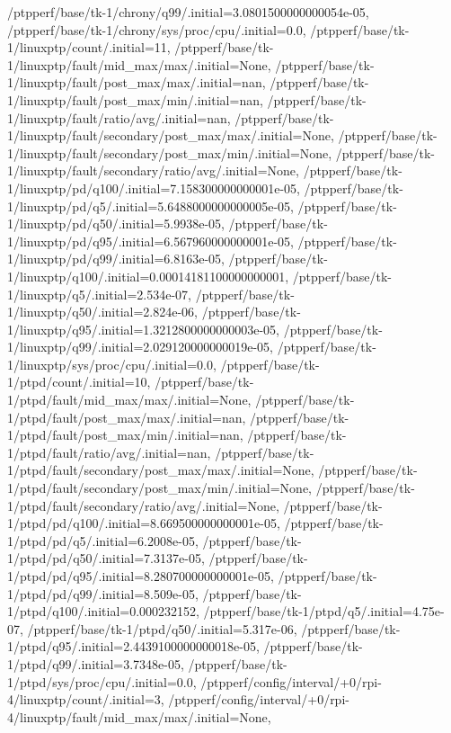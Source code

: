 {    /ptpperf/base/tk-1/chrony/q99/.initial=3.0801500000000054e-05,
    /ptpperf/base/tk-1/chrony/sys/proc/cpu/.initial=0.0,
    /ptpperf/base/tk-1/linuxptp/count/.initial=11,
    /ptpperf/base/tk-1/linuxptp/fault/mid_max/max/.initial=None,
    /ptpperf/base/tk-1/linuxptp/fault/post_max/max/.initial=nan,
    /ptpperf/base/tk-1/linuxptp/fault/post_max/min/.initial=nan,
    /ptpperf/base/tk-1/linuxptp/fault/ratio/avg/.initial=nan,
    /ptpperf/base/tk-1/linuxptp/fault/secondary/post_max/max/.initial=None,
    /ptpperf/base/tk-1/linuxptp/fault/secondary/post_max/min/.initial=None,
    /ptpperf/base/tk-1/linuxptp/fault/secondary/ratio/avg/.initial=None,
    /ptpperf/base/tk-1/linuxptp/pd/q100/.initial=7.158300000000001e-05,
    /ptpperf/base/tk-1/linuxptp/pd/q5/.initial=5.6488000000000005e-05,
    /ptpperf/base/tk-1/linuxptp/pd/q50/.initial=5.9938e-05,
    /ptpperf/base/tk-1/linuxptp/pd/q95/.initial=6.567960000000001e-05,
    /ptpperf/base/tk-1/linuxptp/pd/q99/.initial=6.8163e-05,
    /ptpperf/base/tk-1/linuxptp/q100/.initial=0.00014181100000000001,
    /ptpperf/base/tk-1/linuxptp/q5/.initial=2.534e-07,
    /ptpperf/base/tk-1/linuxptp/q50/.initial=2.824e-06,
    /ptpperf/base/tk-1/linuxptp/q95/.initial=1.3212800000000003e-05,
    /ptpperf/base/tk-1/linuxptp/q99/.initial=2.029120000000019e-05,
    /ptpperf/base/tk-1/linuxptp/sys/proc/cpu/.initial=0.0,
    /ptpperf/base/tk-1/ptpd/count/.initial=10,
    /ptpperf/base/tk-1/ptpd/fault/mid_max/max/.initial=None,
    /ptpperf/base/tk-1/ptpd/fault/post_max/max/.initial=nan,
    /ptpperf/base/tk-1/ptpd/fault/post_max/min/.initial=nan,
    /ptpperf/base/tk-1/ptpd/fault/ratio/avg/.initial=nan,
    /ptpperf/base/tk-1/ptpd/fault/secondary/post_max/max/.initial=None,
    /ptpperf/base/tk-1/ptpd/fault/secondary/post_max/min/.initial=None,
    /ptpperf/base/tk-1/ptpd/fault/secondary/ratio/avg/.initial=None,
    /ptpperf/base/tk-1/ptpd/pd/q100/.initial=8.669500000000001e-05,
    /ptpperf/base/tk-1/ptpd/pd/q5/.initial=6.2008e-05,
    /ptpperf/base/tk-1/ptpd/pd/q50/.initial=7.3137e-05,
    /ptpperf/base/tk-1/ptpd/pd/q95/.initial=8.280700000000001e-05,
    /ptpperf/base/tk-1/ptpd/pd/q99/.initial=8.509e-05,
    /ptpperf/base/tk-1/ptpd/q100/.initial=0.000232152,
    /ptpperf/base/tk-1/ptpd/q5/.initial=4.75e-07,
    /ptpperf/base/tk-1/ptpd/q50/.initial=5.317e-06,
    /ptpperf/base/tk-1/ptpd/q95/.initial=2.4439100000000018e-05,
    /ptpperf/base/tk-1/ptpd/q99/.initial=3.7348e-05,
    /ptpperf/base/tk-1/ptpd/sys/proc/cpu/.initial=0.0,
    /ptpperf/config/interval/+0/rpi-4/linuxptp/count/.initial=3,
    /ptpperf/config/interval/+0/rpi-4/linuxptp/fault/mid_max/max/.initial=None,
}
